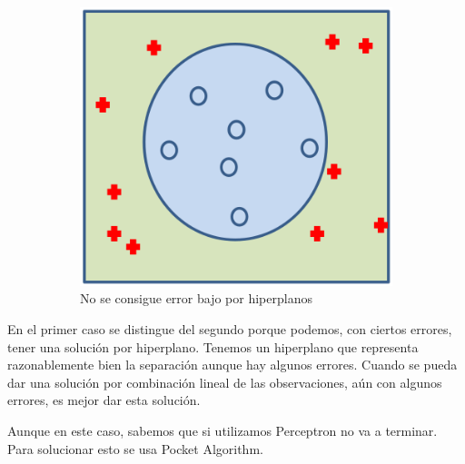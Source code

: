 \documentclass[11pt,a4paper]{article}
\theoremstyle{definition}
\begin{document}
\begin{enumerate}
\begin{itemize}
\begin{figure}[H]
\begin{subfigure}{.3\textwidth}
  		\label{fig:sub1}
		\end{subfigure}%
		\begin{subfigure}{.287\textwidth}
  		\centering
  		\includegraphics[width=1\textwidth]{images/non_sep_elipse}
  		\caption{No se consigue error bajo por hiperplanos}
  		\label{fig:sub2}
		\end{subfigure}
		\caption{}
		\label{fig:test}
	\end{figure}
	En el primer caso se distingue del segundo porque podemos, con ciertos errores, tener una solución por hiperplano. Tenemos un hiperplano que representa razonablemente bien la separación aunque hay algunos errores. Cuando se pueda dar una solución por combinación lineal de las observaciones, aún con algunos errores, es mejor dar esta solución.
	
	Aunque en este caso, sabemos que si utilizamos Perceptron no va a terminar. Para solucionar esto se usa Pocket Algorithm.\\
	

\end{itemize}
\end{enumerate}
\end{document}
